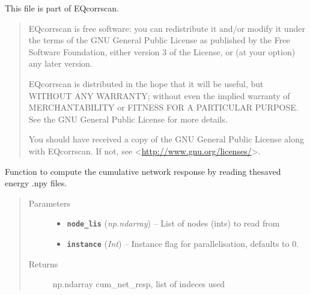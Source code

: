 \documentclass[a4paper,10pt,english]{sphinxmanual}
\begin{document}
This file is part of EQcorrscan.
\begin{quote}

EQcorrscan is free software: you can redistribute it and/or modify
it under the terms of the GNU General Public License as published by
the Free Software Foundation, either version 3 of the License, or
(at your option) any later version.

EQcorrscan is distributed in the hope that it will be useful,
but WITHOUT ANY WARRANTY; without even the implied warranty of
MERCHANTABILITY or FITNESS FOR A PARTICULAR PURPOSE.  See the
GNU General Public License for more details.

You should have received a copy of the GNU General Public License
along with EQcorrscan.  If not, see \textless{}\href{http://www.gnu.org/licenses/}{http://www.gnu.org/licenses/}\textgreater{}.
\end{quote}

\begin{fulllineitems}
\label{submodules/core.bright_lights:bright_lights._cum_net_resp}
Function to compute the cumulative network response by reading thesaved energy .npy files.
\begin{quote}\begin{description}
\item[{Parameters}] \leavevmode\begin{itemize}
\item {} 
\textbf{\texttt{node\_lis}} (\emph{np.ndarray}) -- List of nodes (ints) to read from

\item {} 
\textbf{\texttt{instance}} (\emph{Int}) -- Instance flag for parallelisation, defaults to 0.

\end{itemize}

\item[{Returns}] \leavevmode
np.ndarray cum\_net\_resp, list of indeces used

\end{description}\end{quote}

\end{fulllineitems}

\end{document}

